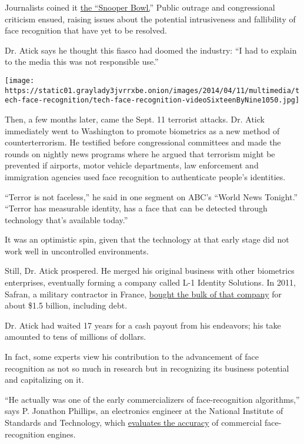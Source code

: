 Journalists coined it
\href{http://news.cnet.com/Firm-defends-snooper-bowl-technology/2100-1023_3-253884.html}{the
``Snooper Bowl.}'' Public outrage and congressional criticism ensued,
raising issues about the potential intrusiveness and fallibility of face
recognition that have yet to be resolved.

Dr. Atick says he thought this fiasco had doomed the industry: ``I had
to explain to the media this was not responsible use.''

\texttt{[image: https://static01.graylady3jvrrxbe.onion/images/2014/04/11/multimedia/tech-face-recognition/tech-face-recognition-videoSixteenByNine1050.jpg]}

Then, a few months later, came the Sept. 11 terrorist attacks. Dr. Atick
immediately went to Washington to promote biometrics as a new method of
counterterrorism. He testified before congressional committees and made
the rounds on nightly news programs where he argued that terrorism might
be prevented if airports, motor vehicle departments, law enforcement and
immigration agencies used face recognition to authenticate people's
identities.

``Terror is not faceless,'' he said in one segment on ABC's ``World News
Tonight.'' ``Terror has measurable identity, has a face that can be
detected through technology that's available today.''

It was an optimistic spin, given that the technology at that early stage
did not work well in uncontrolled environments.

Still, Dr. Atick prospered. He merged his original business with other
biometrics enterprises, eventually forming a company called L-1 Identity
Solutions. In 2011, Safran, a military contractor in France,
\href{http://www.safran-group.com/site-safran-en/finance-397/financial-publications/financial-press-releases/article/safran-completes-the-acquisition-11359}{bought
the bulk of that company} for about \$1.5 billion, including debt.

Dr. Atick had waited 17 years for a cash payout from his endeavors; his
take amounted to tens of millions of dollars.

In fact, some experts view his contribution to the advancement of face
recognition as not so much in research but in recognizing its business
potential and capitalizing on it.

``He actually was one of the early commercializers of face-recognition
algorithms,'' says P. Jonathon Phillips, an electronics engineer at the
National Institute of Standards and Technology, which
\href{http://www.nist.gov/itl/iad/ig/face.cfm}{evaluates the accuracy}
of commercial face-recognition engines.

